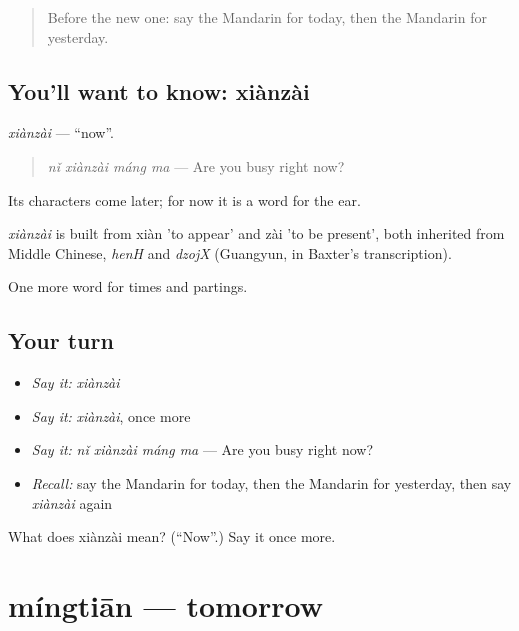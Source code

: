 \begin{quote}
Before the new one: say the Mandarin for today, then the Mandarin for yesterday.
\end{quote}

\subsection*{You'll want to know: xiànzài}
\emph{xiànzài} — \textquotedblleft{}now\textquotedblright{}.

\begin{quote}
\emph{nǐ xiànzài máng ma} — Are you busy right now?
\end{quote}

Its characters come later; for now it is a word for the ear.

\begin{cousinweb}
\emph{xiànzài} is built from xiàn 'to appear' and zài 'to be present', both inherited from Middle Chinese, \emph{henH} and \emph{dzojX} (Guangyun, in Baxter's transcription).
\end{cousinweb}

\begin{grammarlens}[title={What you've built}]
One more word for times and partings.
\end{grammarlens}

\subsection*{Your turn}
\begin{itemize}
\raggedright
  \item \emph{Say it:} \emph{xiànzài}
  \item \emph{Say it:} \emph{xiànzài}, once more
  \item \emph{Say it:} \emph{nǐ xiànzài máng ma} — Are you busy right now?
  \item \emph{Recall:} say the Mandarin for today, then the Mandarin for yesterday, then say \emph{xiànzài} again
\end{itemize}

\begin{tcolorbox}[breakable,colback=teal!4,colframe=teal!35!black,title={Before you move on}]
What does xiànzài mean? (\textquotedblleft{}Now\textquotedblright{}.) Say it once more.
\end{tcolorbox}
\section[míngtiān]{míngtiān — tomorrow}

